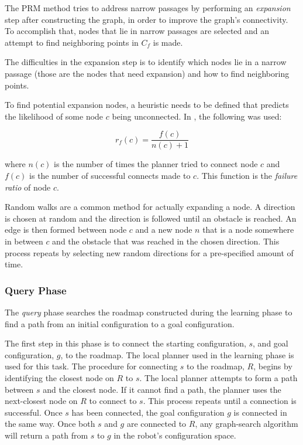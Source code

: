 \documentclass[10pt,conference]{ieeeconf}
\begin{document}
The PRM method tries to address narrow passages by performing an \emph{expansion} step after constructing the graph, in order to improve the graph's connectivity. To accomplish that, nodes that lie in narrow passages are selected and an attempt to find neighboring points in $C_f$ is made. 

The difficulties in the expansion step is to identify which nodes lie in a narrow passage (those are the nodes that need expansion) and how to find neighboring points.

To find potential expansion nodes, a heuristic needs to be defined that predicts the likelihood of some node $c$ being unconnected. In \cite{PRM}, the following was used:

\begin{equation}
r_f(c) = \frac{f(c)}{n(c)+1}
\end{equation}

where $n(c)$ is the number of times the planner tried to connect node $c$ and $f(c)$ is the number of successful connects made to $c$. This function is the \emph{failure ratio} of node $c$.  

Random walks are a common method for actually expanding a node. A direction is chosen at random and the direction is followed until an obstacle is reached. An edge is then formed between node $c$ and a new node $n$ that is a node somewhere in between $c$ and the obstacle that was reached in the chosen direction. This process repeats by selecting new random directions for a pre-specified amount of time.

\subsubsection{Query Phase}

The \emph{query} phase searches the roadmap constructed during the learning phase to find a path from an initial configuration to a goal configuration. 

The first step in this phase is to connect the starting configuration, $s$, and goal configuration, $g$, to the roadmap. The local planner used in the learning phase is used for this task. The procedure for connecting $s$ to the roadmap, $R$, begins by identifying the closest node on $R$ to $s$. The local planner attempts to form a path between $s$ and the closest node. If it cannot find a path, the planner uses the next-closest node on $R$ to connect to $s$. This process repeats until a connection is successful. Once $s$ has been connected, the goal configuration $g$ is connected in the same way. Once both $s$ and $g$ are connected to $R$, any graph-search algorithm will return a path from $s$ to $g$ in the robot's configuration space.
\end{document}

